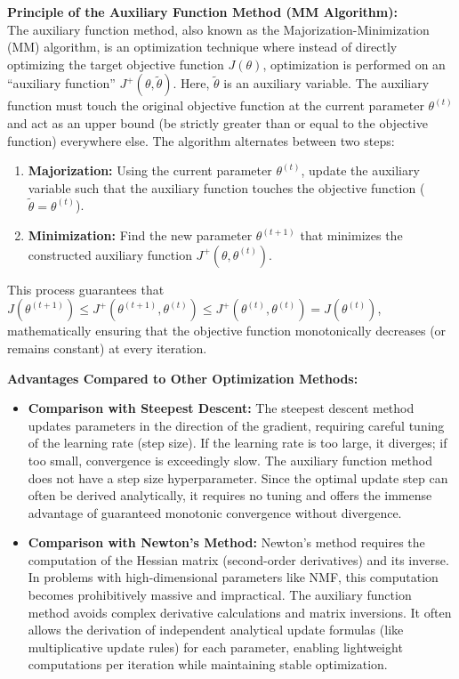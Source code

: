 \documentclass[12pt,a4paper]{article}
\begin{document}
\textbf{Principle of the Auxiliary Function Method (MM Algorithm):} \\
The auxiliary function method, also known as the Majorization-Minimization (MM) algorithm, is an optimization technique where instead of directly optimizing the target objective function $J(\theta)$, optimization is performed on an ``auxiliary function'' $J^+(\theta, \tilde{\theta})$. Here, $\tilde{\theta}$ is an auxiliary variable. The auxiliary function must touch the original objective function at the current parameter $\theta^{(t)}$ and act as an upper bound (be strictly greater than or equal to the objective function) everywhere else.
The algorithm alternates between two steps:
\begin{enumerate}
    \item \textbf{Majorization:} Using the current parameter $\theta^{(t)}$, update the auxiliary variable such that the auxiliary function touches the objective function ($\tilde{\theta} = \theta^{(t)}$).
    \item \textbf{Minimization:} Find the new parameter $\theta^{(t+1)}$ that minimizes the constructed auxiliary function $J^+(\theta, \theta^{(t)})$.
\end{enumerate}
This process guarantees that $J(\theta^{(t+1)}) \leq J^+(\theta^{(t+1)}, \theta^{(t)}) \leq J^+(\theta^{(t)}, \theta^{(t)}) = J(\theta^{(t)})$, mathematically ensuring that the objective function monotonically decreases (or remains constant) at every iteration.

\vspace{1em}
\noindent \textbf{Advantages Compared to Other Optimization Methods:}
\begin{itemize}
    \item \textbf{Comparison with Steepest Descent:} The steepest descent method updates parameters in the direction of the gradient, requiring careful tuning of the learning rate (step size). If the learning rate is too large, it diverges; if too small, convergence is exceedingly slow. The auxiliary function method does not have a step size hyperparameter. Since the optimal update step can often be derived analytically, it requires no tuning and offers the immense advantage of guaranteed monotonic convergence without divergence.
    \item \textbf{Comparison with Newton's Method:} Newton's method requires the computation of the Hessian matrix (second-order derivatives) and its inverse. In problems with high-dimensional parameters like NMF, this computation becomes prohibitively massive and impractical. The auxiliary function method avoids complex derivative calculations and matrix inversions. It often allows the derivation of independent analytical update formulas (like multiplicative update rules) for each parameter, enabling lightweight computations per iteration while maintaining stable optimization.
\end{itemize}
\end{document}
